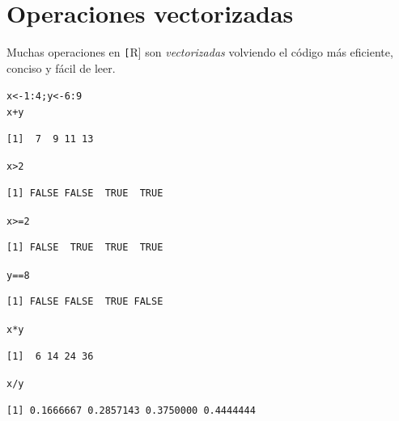 \documentclass{article}\usepackage[]{graphicx}\usepackage[]{color}
\makeatletter
\newcommand{\hlnum}[1]{\textcolor[rgb]{0.686,0.059,0.569}{#1}}%
\newcommand{\hlopt}[1]{\textcolor[rgb]{0,0,0}{#1}}%
\newcommand{\hlstd}[1]{\textcolor[rgb]{0.345,0.345,0.345}{#1}}%
\newcommand{\hlkwb}[1]{\textcolor[rgb]{0.69,0.353,0.396}{#1}}%
\newenvironment{kframe}{%
 \def\at@end@of@kframe{}%
 \ifinner\ifhmode%
  \def\at@end@of@kframe{\end{minipage}}%
  \begin{minipage}{\columnwidth}%
 \fi\fi%
 \def\FrameCommand##1{\hskip\@totalleftmargin \hskip-\fboxsep
 \colorbox{shadecolor}{##1}\hskip-\fboxsep
     \hskip-\linewidth \hskip-\@totalleftmargin \hskip\columnwidth}%
 \MakeFramed {\advance\hsize-\width
   \@totalleftmargin\z@ \linewidth\hsize
   \@setminipage}}%
 {\par\unskip\endMakeFramed%
 \at@end@of@kframe}
\newenvironment{knitrout}{}{} %
\makeatother
\begin{document}
\section{Operaciones vectorizadas}
Muchas operaciones en \texttt[R] son \textit{vectorizadas} volviendo el código más eficiente, conciso y fácil de leer.
\begin{knitrout}
\color{fgcolor}\begin{kframe}
\begin{alltt}
  \hlstd{x} \hlkwb{<-} \hlnum{1}\hlopt{:}\hlnum{4}\hlstd{; y} \hlkwb{<-} \hlnum{6}\hlopt{:}\hlnum{9}
  \hlstd{x} \hlopt{+} \hlstd{y}
\end{alltt}
\begin{verbatim}
[1]  7  9 11 13
\end{verbatim}
\begin{alltt}
  \hlstd{x} \hlopt{>} \hlnum{2}
\end{alltt}
\begin{verbatim}
[1] FALSE FALSE  TRUE  TRUE
\end{verbatim}
\begin{alltt}
  \hlstd{x} \hlopt{>=} \hlnum{2}
\end{alltt}
\begin{verbatim}
[1] FALSE  TRUE  TRUE  TRUE
\end{verbatim}
\begin{alltt}
  \hlstd{y} \hlopt{==} \hlnum{8}
\end{alltt}
\begin{verbatim}
[1] FALSE FALSE  TRUE FALSE
\end{verbatim}
\begin{alltt}
  \hlstd{x} \hlopt{*} \hlstd{y}
\end{alltt}
\begin{verbatim}
[1]  6 14 24 36
\end{verbatim}
\begin{alltt}
  \hlstd{x} \hlopt{/} \hlstd{y}
\end{alltt}
\begin{verbatim}
[1] 0.1666667 0.2857143 0.3750000 0.4444444
\end{verbatim}
\end{kframe}
\end{knitrout}
      
\end{document}
